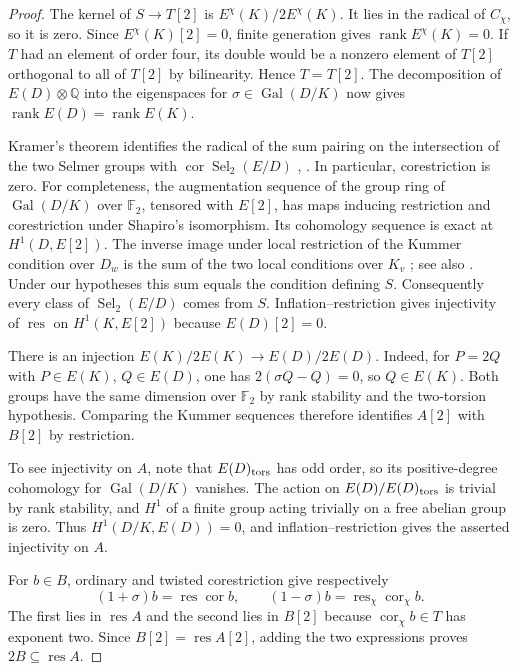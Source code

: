 \documentclass[11pt]{article}
\newcommand{\Sel}{\operatorname{Sel}}
\newcommand{\res}{\operatorname{res}}
\newcommand{\cor}{\operatorname{cor}}
\newcommand{\rk}{\operatorname{rank}}
\begin{document}
\begin{proof}
The kernel of $S\to T[2]$ is $E^\chi(K)/2E^\chi(K)$. It lies in the
radical of $C_\chi$, so it is zero. Since $E^\chi(K)[2]=0$,
finite generation gives $\rk E^\chi(K)=0$. If $T$ had an element of
order four, its double would be a nonzero element of $T[2]$ orthogonal
to all of $T[2]$ by bilinearity. Hence $T=T[2]$. The decomposition of
$E(D)\otimes\mathbb Q$ into the eigenspaces for
$\sigma\in\operatorname{Gal}(D/K)$ now gives $\rk E(D)=\rk E(K)$.

Kramer's theorem identifies the radical of the sum pairing on the
intersection of the two Selmer groups with $\cor\Sel_2(E/D)$
\cite[Thm.~2]{Kramer}, \cite[Thm.~8.4 and Rem.~8.5]{MS}.
In particular, corestriction is zero. For completeness, the
augmentation sequence of the group ring of $\operatorname{Gal}(D/K)$
over $\mathbb F_2$, tensored with $E[2]$, has maps inducing restriction
and corestriction under Shapiro's isomorphism. Its cohomology sequence
is exact at $H^1(D,E[2])$. The inverse image under local restriction
of the Kummer condition over $D_w$ is the sum of the two local
conditions over $K_v$ \cite[Lemmas~2--3]{Kramer};
see also \cite[Rem.~4.4 and Lem.~4.6]{MP}. Under our hypotheses this
sum equals the condition defining $S$. Consequently every class of
$\Sel_2(E/D)$ comes from $S$. Inflation--restriction gives injectivity
of $\res$ on $H^1(K,E[2])$ because $E(D)[2]=0$.

There is an injection $E(K)/2E(K)\to E(D)/2E(D)$. Indeed, for $P=2Q$
with $P\in E(K)$, $Q\in E(D)$, one has $2(\sigma Q-Q)=0$, so $Q\in E(K)$.
Both groups have the same dimension over $\mathbb F_2$ by rank stability
and the two-torsion hypothesis. Comparing the Kummer sequences therefore
identifies $A[2]$ with $B[2]$ by restriction.

To see injectivity on $A$, note that $E(D)_{\rm tors}$ has odd order,
so its positive-degree cohomology for $\operatorname{Gal}(D/K)$ vanishes.
The action on $E(D)/E(D)_{\rm tors}$ is trivial by rank stability,
and $H^1$ of a finite group acting trivially on a free abelian group
is zero. Thus $H^1(D/K,E(D))=0$, and inflation--restriction gives
the asserted injectivity on $A$.

For $b\in B$, ordinary and twisted corestriction give respectively
\[
 (1+\sigma)b=\res\cor b,\qquad
 (1-\sigma)b=\res_\chi\cor_\chi b.
\]
The first lies in $\res A$ and the second lies in $B[2]$ because
$\cor_\chi b\in T$ has exponent two. Since $B[2]=\res A[2]$, adding
the two expressions proves $2B\subseteq\res A$.


\end{proof}
\end{document}
